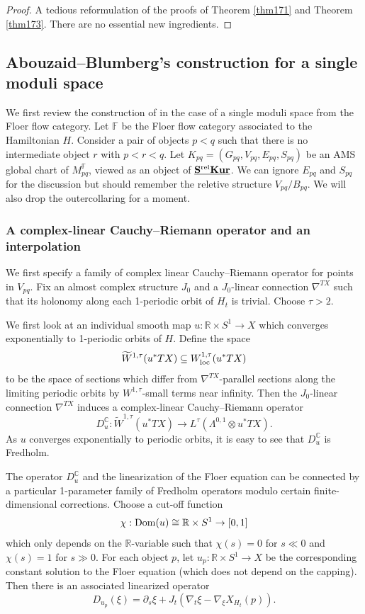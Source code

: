 \documentclass[reqno, 10pt]{amsart}
\numberwithin{equation}{section}
\numberwithin{equation}{section}
\renewcommand{\subset}{\subseteq}
\theoremstyle{definition}
\theoremstyle{remark}
\newcommand{\beqn}{\begin{equation*}}
\newcommand{\eeqn}{\end{equation*}}
\newcommand{\mb}{\mathbb}
\newcommand{\wt}{\widetilde}
\newcommand{\uds}[1]{\underline{\smash{#1}}}
\begin{document}
\begin{proof}
A tedious reformulation of the proofs of Theorem \ref{thm171} and Theorem \ref{thm173}. There are no essential new ingredients. 
\end{proof}


\subsection{Abouzaid--Blumberg's construction for a single moduli space}

We first review the construction of \cite[Section 11]{Abouzaid_Blumberg} in the case of a single moduli space from the Floer flow category. Let ${\mb F}$ be the Floer flow category associated to the Hamiltonian $H$. Consider a pair of objects $p<q$ such that there is no intermediate object $r$ with $p<r<q$. Let $K_{pq} = (G_{pq}, V_{pq}, E_{pq}, S_{pq})$ be an AMS global chart of $M_{pq}^{\mb F}$, viewed as an object of $\uds{\bf S^{\rm rel} Kur}$. We can ignore $E_{pq}$ and $S_{pq}$ for the discussion but should remember the reletive structure $V_{pq}/B_{pq}$. We will also drop the outercollaring for a moment. 

\subsubsection{ A complex-linear Cauchy--Riemann operator and an interpolation}

We first specify a family of complex linear Cauchy--Riemann operator for points in $V_{pq}$. Fix an almost complex structure $J_0$ and a $J_0$-linear connection $\nabla^{TX}$ such that its holonomy along each 1-periodic orbit of $H_t$ is trivial. Choose $\tau > 2$. 

We first look at an individual smooth map $u: {\mb R} \times S^1 \to X$ which converges exponentially to 1-periodic orbits of $H$. Define the space
\beqn
\wt W^{1,\tau}(u^* TX) \subset W^{1,\tau}_{\rm loc}(u^* TX)
\eeqn
to be the space of sections which differ from $\nabla^{TX}$-parallel sections along the limiting periodic orbits by $W^{1,\tau}$-small terms near infinity. Then the $J_0$-linear connection $\nabla^{TX}$ induces a complex-linear Cauchy--Riemann operator
\beqn
D_u^{\mb C}: \wt W^{1,\tau}(u^*TX) \to L^\tau (\Lambda^{0,1} \otimes u^* TX).
\eeqn
As $u$ converges exponentially to periodic orbits, it is easy to see that $D_u^{\mb C}$ is Fredholm.

The operator $D_u^{\mb C}$ and the linearization of the Floer equation can be connected by a particular 1-parameter family of Fredholm operators modulo certain finite-dimensional corrections. Choose a cut-off function 
\beqn
\chi: {\rm Dom}(u) \cong {\mb R} \times S^1 \to [0, 1]
\eeqn
which only depends on the ${\mb R}$-variable such that $\chi(s) = 0$ for $s \ll 0$ and $\chi(s) = 1$ for $s \gg 0$. For each object $p$, let $u_p: {\mb R} \times S^1 \to X$ be the corresponding constant solution to the Floer equation (which does not depend on the capping). Then there is an associated linearized operator
\beqn
D_{u_p}(\xi) = \partial_s \xi + J_t \left( \nabla_t \xi - \nabla_\xi X_{H_t}(p) \right).
\eeqn
\end{document}
